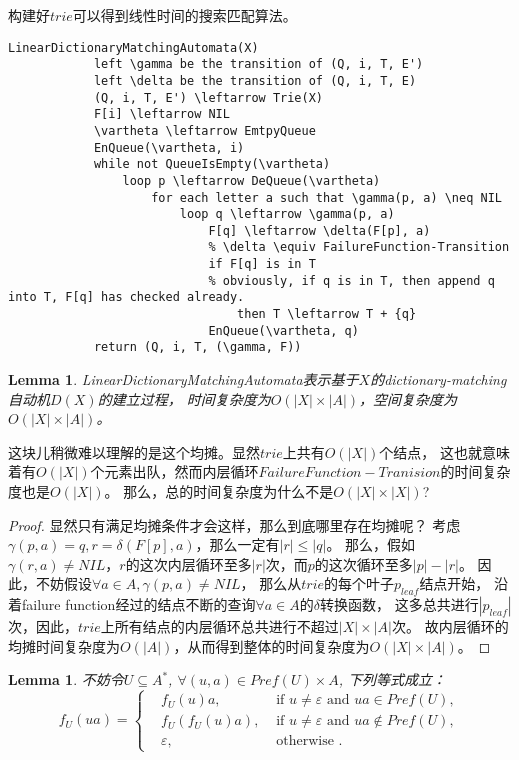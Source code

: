 \documentclass[UTF8]{ctexart}
\newtheorem{lem}[thm]{Lemma}
\theoremstyle{definition}
\theoremstyle{remark}
\numberwithin{equation}{subsection}
\begin{document}
	构建好$trie$可以得到线性时间的搜索匹配算法。
	\begin{lstlisting}[frame=shadowbox,framexleftmargin=5mm,rulesepcolor=\color{gray},numbers=none]
		LinearDictionaryMatchingAutomata(X)
			left \gamma be the transition of (Q, i, T, E')
			left \delta be the transition of (Q, i, T, E)
			(Q, i, T, E') \leftarrow Trie(X)
			F[i] \leftarrow NIL
			\vartheta \leftarrow EmtpyQueue
			EnQueue(\vartheta, i)
			while not QueueIsEmpty(\vartheta)
				loop p \leftarrow DeQueue(\vartheta)
					for each letter a such that \gamma(p, a) \neq NIL
						loop q \leftarrow \gamma(p, a)
							F[q] \leftarrow \delta(F[p], a)
							% \delta \equiv FailureFunction-Transition
							if F[q] is in T
							% obviously, if q is in T, then append q into T, F[q] has checked already.
								then T \leftarrow T + {q}
							EnQueue(\vartheta, q)
			return (Q, i, T, (\gamma, F))
	\end{lstlisting}
	\begin{lem}
		LinearDictionaryMatchingAutomata表示基于$X$的dictionary-matching自动机$D(X)$的建立过程，
		时间复杂度为$O(|X|\times|A|)$，空间复杂度为$O(|X|\times|A|)$。
	\end{lem}
	
	这块儿稍微难以理解的是这个均摊。显然$trie$上共有$O(|X|)$个结点，
	这也就意味着有$O(|X|)$个元素出队，然而内层循环$FailureFunction-Tranision$的时间复杂度也是$O(|X|)$。
	那么，总的时间复杂度为什么不是$O(|X|\times|X|)$?
	\begin{proof}
		显然只有满足均摊条件才会这样，那么到底哪里存在均摊呢？
		考虑$\gamma(p,a) = q, r = \delta(F[p], a)$，那么一定有$|r| \le |q|$。
		那么，假如$\gamma(r,a) \neq NIL$，$r$的这次内层循环至多$|r|$次，而$p$的这次循环至多$|p|-|r|$。
		因此，不妨假设$\forall a \in A, \gamma(p,a) \neq NIL$，
		那么从$trie$的每个叶子$p_{leaf}$结点开始，
		沿着failure function经过的结点不断的查询$\forall a \in A$的$\delta$转换函数，
		这多总共进行$|p_{leaf}|$次，因此，$trie$上所有结点的内层循环总共进行不超过$|X| \times |A|$次。
		故内层循环的均摊时间复杂度为$O(|A|)$，从而得到整体的时间复杂度为$O(|X|\times|A|)$。
	\end{proof}
	
	\begin{lem}
		不妨令$U \subseteq A^*$, $\forall (u,a) \in Pref(U) \times A$, 下列等式成立：
		\[
			f_U(ua) =
			\left\{
				\begin{aligned}
					&f_U(u)a, 		&\text{ if } u \neq \varepsilon \text{ and } ua \in Pref(U),       \\
					&f_U(f_U(u)a), 	&\text{ if } u \neq \varepsilon \text{ and } ua \notin Pref(U),    \\
					&\varepsilon,	&\text{ otherwise }.
				\end{aligned}
			\right .
		\]
	\end{lem}
	
\end{document}
